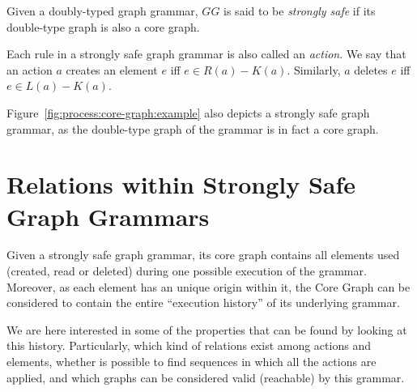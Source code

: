 \begin{definition} Given \doublyTypedGraphGrammarCore{} a doubly-typed graph grammar, $GG$ is said to be \emph{strongly safe} if its double-type graph is also a core graph.

  Each rule in a strongly safe graph grammar is also called an \emph{action}. We say that an action $a$ creates an element $e$ iff $e \in R(a) - K(a)$. Similarly, $a$ deletes $e$ iff \mbox{$e \in L(a) - K(a)$}.
\end{definition}

\begin{example} Figure~\ref{fig:process:core-graph:example} also depicts a strongly safe graph grammar, as the double-type graph of the grammar is in fact a core graph.
\end{example}

\section{Relations within Strongly Safe Graph Grammars}

Given a strongly safe graph grammar, its core graph contains all elements used (created, read or deleted) during one possible execution of the grammar. Moreover, as each element has an unique origin within it, the Core Graph can be considered to contain the entire ``execution history'' of its underlying grammar. 

We are here interested in some of the properties that can be found by looking at this history. Particularly, which kind of relations exist among actions and elements, whether is possible to find sequences in which all the actions are applied, and which graphs can be considered valid (reachable) by this grammar.

